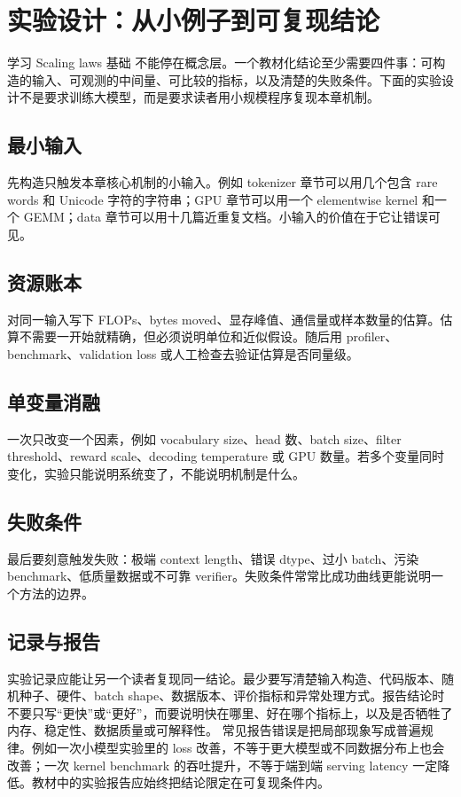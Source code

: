 \documentclass[a4paper]{article}
\begin{document}
\section{实验设计：从小例子到可复现结论}
学习 Scaling laws 基础 不能停在概念层。一个教材化结论至少需要四件事：可构造的输入、可观测的中间量、可比较的指标，以及清楚的失败条件。下面的实验设计不是要求训练大模型，而是要求读者用小规模程序复现本章机制。
\subsection{最小输入}
先构造只触发本章核心机制的小输入。例如 tokenizer 章节可以用几个包含 rare words 和 Unicode 字符的字符串；GPU 章节可以用一个 elementwise kernel 和一个 GEMM；data 章节可以用十几篇近重复文档。小输入的价值在于它让错误可见。
\subsection{资源账本}
对同一输入写下 FLOPs、bytes moved、显存峰值、通信量或样本数量的估算。估算不需要一开始就精确，但必须说明单位和近似假设。随后用 profiler、benchmark、validation loss 或人工检查去验证估算是否同量级。
\subsection{单变量消融}
一次只改变一个因素，例如 vocabulary size、head 数、batch size、filter threshold、reward scale、decoding temperature 或 GPU 数量。若多个变量同时变化，实验只能说明系统变了，不能说明机制是什么。
\subsection{失败条件}
最后要刻意触发失败：极端 context length、错误 dtype、过小 batch、污染 benchmark、低质量数据或不可靠 verifier。失败条件常常比成功曲线更能说明一个方法的边界。
\subsection{记录与报告}
实验记录应能让另一个读者复现同一结论。最少要写清楚输入构造、代码版本、随机种子、硬件、batch shape、数据版本、评价指标和异常处理方式。报告结论时不要只写“更快”或“更好”，而要说明快在哪里、好在哪个指标上，以及是否牺牲了内存、稳定性、数据质量或可解释性。
常见报告错误是把局部现象写成普遍规律。例如一次小模型实验里的 loss 改善，不等于更大模型或不同数据分布上也会改善；一次 kernel benchmark 的吞吐提升，不等于端到端 serving latency 一定降低。教材中的实验报告应始终把结论限定在可复现条件内。
\end{document}
